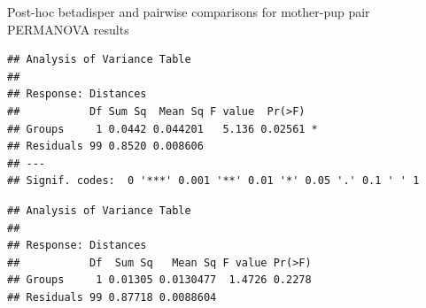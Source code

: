 \documentclass[]{article}
\newenvironment{Shaded}{\begin{snugshade}}{\end{snugshade}}
\newcommand{\KeywordTok}[1]{\textcolor[rgb]{0.13,0.29,0.53}{\textbf{#1}}}
\newcommand{\DataTypeTok}[1]{\textcolor[rgb]{0.13,0.29,0.53}{#1}}
\newcommand{\StringTok}[1]{\textcolor[rgb]{0.31,0.60,0.02}{#1}}
\newcommand{\CommentTok}[1]{\textcolor[rgb]{0.56,0.35,0.01}{\textit{#1}}}
\newcommand{\OperatorTok}[1]{\textcolor[rgb]{0.81,0.36,0.00}{\textbf{#1}}}
\newcommand{\NormalTok}[1]{#1}
\begin{document}
Post-hoc betadisper and pairwise comparisons for mother-pup pair
PERMANOVA results

\begin{Shaded}
\end{Shaded}

\begin{verbatim}
## Analysis of Variance Table
## 
## Response: Distances
##           Df Sum Sq  Mean Sq F value  Pr(>F)  
## Groups     1 0.0442 0.044201   5.136 0.02561 *
## Residuals 99 0.8520 0.008606                  
## ---
## Signif. codes:  0 '***' 0.001 '**' 0.01 '*' 0.05 '.' 0.1 ' ' 1
\end{verbatim}

\begin{Shaded}
\end{Shaded}

\begin{verbatim}
## Analysis of Variance Table
## 
## Response: Distances
##           Df  Sum Sq   Mean Sq F value Pr(>F)
## Groups     1 0.01305 0.0130477  1.4726 0.2278
## Residuals 99 0.87718 0.0088604
\end{verbatim}

\begin{Shaded}
\end{Shaded}
\end{document}
